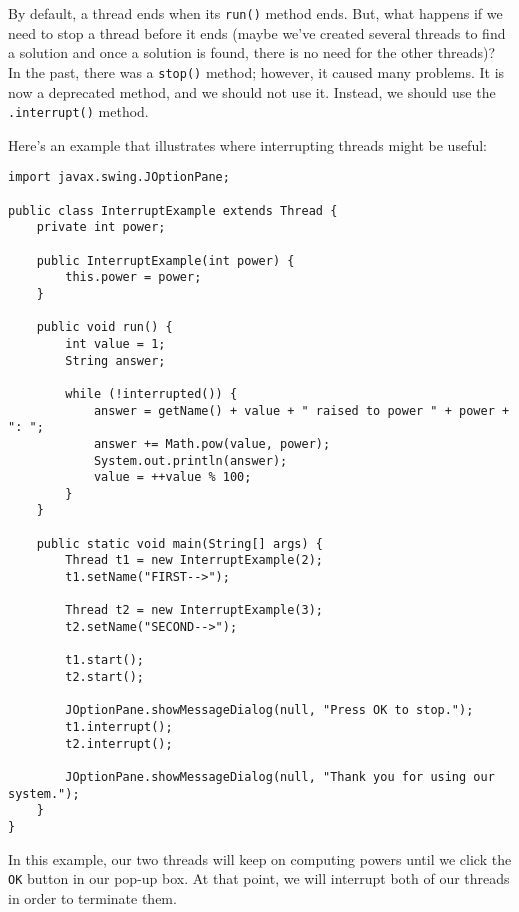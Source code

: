 By default, a thread ends when its \verb!run()! method ends. But, what happens if we need to stop a thread before it ends (maybe we've created several threads to find a solution and once a solution is found, there is no need for the other threads)? In the past, there was a \verb!stop()! method; however, it caused many problems. It is now a deprecated method, and we should not use it. Instead, we should use the \verb!.interrupt()! method. 

Here's an example that illustrates where interrupting threads might be useful:

\begin{lstlisting}
import javax.swing.JOptionPane;

public class InterruptExample extends Thread {
	private int power;

	public InterruptExample(int power) {
		this.power = power;
	}

	public void run() {
		int value = 1;
		String answer;

		while (!interrupted()) {
			answer = getName() + value + " raised to power " + power + ": ";
			answer += Math.pow(value, power);
			System.out.println(answer);
			value = ++value % 100;
		}
	}

	public static void main(String[] args) {
		Thread t1 = new InterruptExample(2);
		t1.setName("FIRST-->");

		Thread t2 = new InterruptExample(3);
		t2.setName("SECOND-->");

		t1.start();
		t2.start();

		JOptionPane.showMessageDialog(null, "Press OK to stop.");
		t1.interrupt();
		t2.interrupt();

		JOptionPane.showMessageDialog(null, "Thank you for using our system.");
	}
}
\end{lstlisting}
 
In this example, our two threads will keep on computing powers until we click the \verb!OK! button in our pop-up box. At that point, we will interrupt both of our threads in order to terminate them. 
